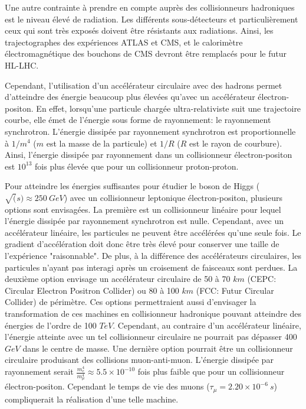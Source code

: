 Une autre contrainte à prendre en compte auprès des collisionneurs hadroniques est le niveau élevé de radiation. Les différents sous-détecteurs et particulièrement ceux qui sont très exposés doivent être résistants aux radiations. Ainsi, les trajectographes des expériences ATLAS et CMS, et le calorimètre électromagnétique des bouchons de CMS devront être remplacés pour le futur HL-LHC. 

Cependant, l'utilisation d'un accélérateur circulaire avec des hadrons permet d'atteindre des énergie beaucoup plus élevées qu'avec un accélérateur électron-positon. En effet, lorsqu'une particule chargée ultra-relativiste suit une trajectoire courbe, elle émet de l'énergie sous forme de rayonnement: le rayonnement synchrotron. L'énergie dissipée par rayonnement synchrotron est proportionnelle à $1/m^4$ ($m$ est la masse de la particule) et $1/R$ ($R$ est le rayon de courbure). Ainsi, l'énergie dissipée par rayonnement dans un collisionneur électron-positon est $10^{13}$ fois plus élevée que pour un collisionneur proton-proton. 

Pour atteindre les énergies suffisantes pour étudier le boson de Higgs ($\sqrt(s)\approx250~GeV$) avec un collisionneur leptonique électron-positon, plusieurs options sont envisagées. La première est un collisionneur linéaire pour lequel l'énergie dissipée par rayonnement synchrotron est nulle. Cependant, avec un accélérateur linéaire, les particules ne peuvent être accélérées qu'une seule fois. Le gradient d'accélération doit donc être très élevé pour conserver une taille de l'expérience "raisonnable". De plus, à la différence des accélérateurs circulaires, les particules n'ayant pas interagi après un croisement de faisceaux sont perdues. La deuxième option envisage un accélérateur circulaire de 50 à 70 $km$ (CEPC: Circular Electron Positron Collider) ou 80 à 100 $km$ (FCC: Futur Circular Collider) de périmètre. Ces options permettraient aussi d'envisager la transformation de ces machines en collisionneur hadronique pouvant atteindre des énergies de l'ordre de 100 $TeV$. Cependant, au contraire d'un accélérateur linéaire, l'énergie atteinte avec un tel collisionneur circulaire ne pourrait pas dépasser 400 $GeV$ dans le centre de masse. Une dernière option pourrait être un collisionneur circulaire produisant des collisions muon-anti-muon. L'énergie dissipée par rayonnement serait $\frac{m_{e}^4}{m_{\mu}^4}\approx5.5\times10^{-10}$ fois plus faible que pour un collisionneur électron-positon. Cependant le temps de vie des muons ($\tau_{\mu}=2.20\times10^{-6}~s$) compliquerait la réalisation d'une telle machine.

